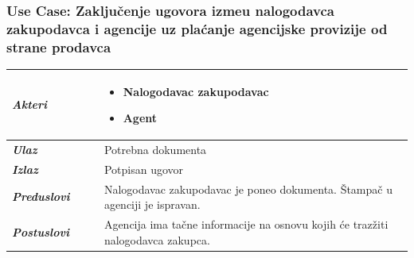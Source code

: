 \documentclass[20pt]{article}
\begin{document}
\newpage
{}
\setlength{\parindent}{1cm}
\fontsize{13}{18} \selectfont

\subsubsection{\bfseries \large Use Case: Zaklju\v {c}enje ugovora izme\dj u nalogodavca zakupodavca i agencije uz pla\' canje agencijske provizije od strane prodavca}
\begin{center}
\begin{longtable}{p{0.23\linewidth} p{0.77\linewidth}}
 \hline
 {\it \bfseries Akteri} & \begin{itemize}
    \item Nalogodavac zakupodavac
    \item Agent
\end{itemize}\\
\hline

 {\it \bfseries Ulaz} & Potrebna dokumenta\\
 \hline
 
 {\it \bfseries Izlaz} & Potpisan ugovor\\
 \hline
 
 {\it \bfseries Preduslovi} & Nalogodavac zakupodavac je poneo dokumenta. \v {S}tampa\v {c} u agenciji je ispravan.  \\
 \hline
 
 {\it \bfseries Postuslovi} & Agencija ima ta\v {c}ne informacije na osnovu kojih \' ce traz\v {z}iti nalogodavca zakupca. \\
 \hline


\end{longtable}
\end{center}
\end{document}

